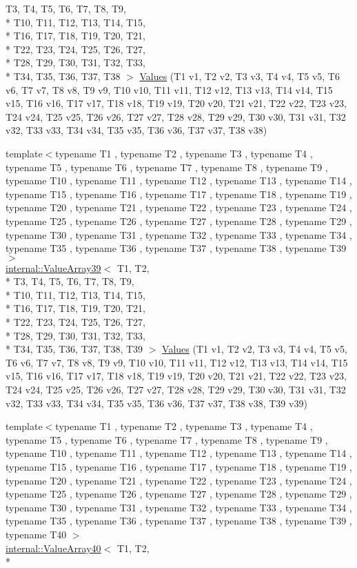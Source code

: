\begin{DoxyCompactItemize}
T3, T4, T5, T6, T7, T8, T9, \\*
T10, T11, T12, T13, T14, T15, \\*
T16, T17, T18, T19, T20, T21, \\*
T22, T23, T24, T25, T26, T27, \\*
T28, T29, T30, T31, T32, T33, \\*
T34, T35, T36, T37, T38 $>$ \hyperlink{namespacetesting_aabc33ee31d17eb0b0bed3401d62266d9}{Values} (T1 v1, T2 v2, T3 v3, T4 v4, T5 v5, T6 v6, T7 v7, T8 v8, T9 v9, T10 v10, T11 v11, T12 v12, T13 v13, T14 v14, T15 v15, T16 v16, T17 v17, T18 v18, T19 v19, T20 v20, T21 v21, T22 v22, T23 v23, T24 v24, T25 v25, T26 v26, T27 v27, T28 v28, T29 v29, T30 v30, T31 v31, T32 v32, T33 v33, T34 v34, T35 v35, T36 v36, T37 v37, T38 v38)
\item 
{\footnotesize template$<$typename T1 , typename T2 , typename T3 , typename T4 , typename T5 , typename T6 , typename T7 , typename T8 , typename T9 , typename T10 , typename T11 , typename T12 , typename T13 , typename T14 , typename T15 , typename T16 , typename T17 , typename T18 , typename T19 , typename T20 , typename T21 , typename T22 , typename T23 , typename T24 , typename T25 , typename T26 , typename T27 , typename T28 , typename T29 , typename T30 , typename T31 , typename T32 , typename T33 , typename T34 , typename T35 , typename T36 , typename T37 , typename T38 , typename T39 $>$ }\\\hyperlink{classtesting_1_1internal_1_1_value_array39}{internal\-::\-Value\-Array39}$<$ T1, T2, \\*
T3, T4, T5, T6, T7, T8, T9, \\*
T10, T11, T12, T13, T14, T15, \\*
T16, T17, T18, T19, T20, T21, \\*
T22, T23, T24, T25, T26, T27, \\*
T28, T29, T30, T31, T32, T33, \\*
T34, T35, T36, T37, T38, T39 $>$ \hyperlink{namespacetesting_aba3a6a2dcb9660c6ccb1d867c7a137ee}{Values} (T1 v1, T2 v2, T3 v3, T4 v4, T5 v5, T6 v6, T7 v7, T8 v8, T9 v9, T10 v10, T11 v11, T12 v12, T13 v13, T14 v14, T15 v15, T16 v16, T17 v17, T18 v18, T19 v19, T20 v20, T21 v21, T22 v22, T23 v23, T24 v24, T25 v25, T26 v26, T27 v27, T28 v28, T29 v29, T30 v30, T31 v31, T32 v32, T33 v33, T34 v34, T35 v35, T36 v36, T37 v37, T38 v38, T39 v39)
\item 
{\footnotesize template$<$typename T1 , typename T2 , typename T3 , typename T4 , typename T5 , typename T6 , typename T7 , typename T8 , typename T9 , typename T10 , typename T11 , typename T12 , typename T13 , typename T14 , typename T15 , typename T16 , typename T17 , typename T18 , typename T19 , typename T20 , typename T21 , typename T22 , typename T23 , typename T24 , typename T25 , typename T26 , typename T27 , typename T28 , typename T29 , typename T30 , typename T31 , typename T32 , typename T33 , typename T34 , typename T35 , typename T36 , typename T37 , typename T38 , typename T39 , typename T40 $>$ }\\\hyperlink{classtesting_1_1internal_1_1_value_array40}{internal\-::\-Value\-Array40}$<$ T1, T2, \\*

\end{DoxyCompactItemize}

